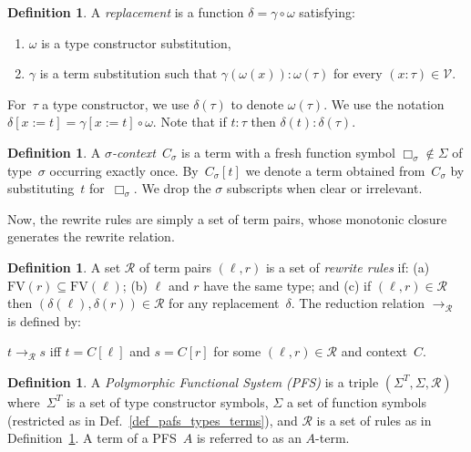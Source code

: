 \documentclass[a4paper,UKenglish,cleveref,autoref,numberwithinsect]{lipics-v2019}
\theoremstyle{definition}
\newtheorem{defn}[theorem]{Definition}
\newcommand{\Vars}{\mathcal{V}}
\newcommand{\Rules}{\mathcal{R}}
\newcommand{\subst}[2]{#1:=#2}
\newcommand{\arr}[1]{\longrightarrow_{#1}}
\newcommand{\FV}{\mathrm{FV}}
\begin{document}
\begin{defn}\label{def_replacement}
  A \emph{replacement} is a function $\delta = \gamma \circ \omega$
  satisfying:
  \begin{enumerate}
  \item $\omega$ is a type constructor substitution,
  \item $\gamma$ is a term substitution such that
    $\gamma(\omega(x)) : \omega(\tau)$ for every
    $(x : \tau) \in \Vars$.
  \end{enumerate}

  For~$\tau$ a type constructor, we use $\delta(\tau)$ to denote
  $\omega(\tau)$. We use the notation
  $\delta[\subst{x}{t}] = \gamma[\subst{x}{t}] \circ \omega$. Note
  that if $t : \tau$ then $\delta(t) : \delta(\tau)$.
\end{defn}

\begin{defn}\label{def:context}
  A \emph{$\sigma$-context}~$C_\sigma$ is a term with a fresh function
  symbol $\Box_\sigma \notin \Sigma$ of type~$\sigma$ occurring
  exactly once. By~$C_\sigma[t]$ we denote a term obtained
  from~$C_\sigma$ by substituting~$t$ for~$\Box_\sigma$. We drop the
  $\sigma$ subscripts when clear or irrelevant.
\end{defn}

Now, the rewrite rules are simply a set of term pairs, whose
monotonic closure generates the rewrite relation.

\begin{defn}\label{def_rules}
  A set $\Rules$ of term pairs $(\ell,r)$ is a set of \emph{rewrite
    rules} if: (a) $\FV(r) \subseteq \FV(\ell)$; (b) $\ell$ and $r$
  have the same type; and (c) if $(\ell,r) \in \Rules$
  then $(\delta(\ell),\delta(r)) \in \Rules$ for any
  replacement~$\delta$.  The reduction relation $\arr{\Rules}$ is
  defined by:

\begin{center}
  $t \arr{\Rules}
  s$ iff $t = C[\ell]$ and $s = C[r]$ for some $(\ell,r)\in\Rules$ and
  context~$C$.
\end{center}
\end{defn}

\begin{defn}\label{def_pafs}
  A \emph{Polymorphic Functional System (PFS)} is a triple
  $(\Sigma^T,\Sigma,\Rules)$ where~$\Sigma^T$ is a set of type
  constructor symbols, $\Sigma$ a set of function symbols (restricted
  as in Def.~\ref{def_pafs_types_terms}), and $\Rules$ is a set
  of rules as in Definition~\ref{def_rules}. A term of a
  PFS~$A$ is referred to as an $A$-term.
\end{defn}
\end{document}
